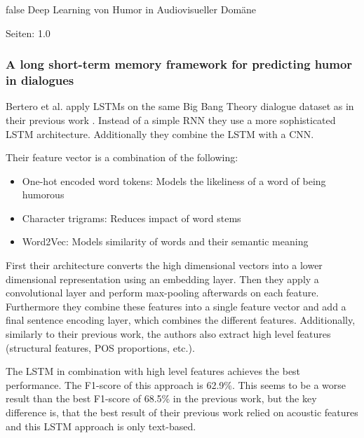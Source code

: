 \documentclass[draft,final,oneside]{vutinfth} %
\begin{document}

\if false
Deep Learning von Humor in Audiovisueller Domäne

Seiten: 1.0

\cite{Bertero2016DeepLO}
\fi

\subsubsection{A long short-term memory framework for predicting humor in dialogues}

Bertero et al. apply LSTMs on the same Big Bang Theory dialogue dataset as in their previous work \cite{Bertero2016DeepLO}\cite{bertero2016long}. Instead of a simple RNN they use a more sophisticated LSTM architecture. Additionally they combine the LSTM with a CNN.

Their feature vector is a combination of the following:
\begin{itemize}

\item One-hot encoded word tokens: Models the likeliness of a word of being humorous
\item Character trigrams: Reduces impact of word stems
\item Word2Vec: Models similarity of words and their semantic meaning \cite{word2vec}

\end{itemize}

First their architecture converts the high dimensional vectors into a lower dimensional representation using an embedding layer. Then they apply a convolutional layer and perform max-pooling afterwards on each feature. Furthermore they combine these features into a single feature vector and add a final sentence encoding layer, which combines the different features. Additionally, similarly to their previous work, the authors also extract high level features (structural features, POS proportions, etc.).

The LSTM in combination with high level features achieves the best performance. The F1-score of this approach is 62.9\%. This seems to be a worse result than the best F1-score of 68.5\% in the previous work, but the key difference is, that the best result of their previous work relied on acoustic features and this LSTM approach is only text-based.
\end{document}
